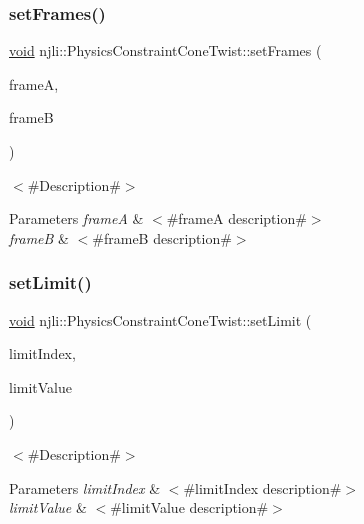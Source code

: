 \subsubsection{\texorpdfstring{set\+Frames()}{setFrames()}}
{\footnotesize\ttfamily \mbox{\hyperlink{_thread_8h_af1e856da2e658414cb2456cb6f7ebc66}{void}} njli\+::\+Physics\+Constraint\+Cone\+Twist\+::set\+Frames (\begin{DoxyParamCaption}\item[{const bt\+Transform \&}]{frameA,  }\item[{const bt\+Transform \&}]{frameB }\end{DoxyParamCaption})}

$<$\#\+Description\#$>$


\begin{DoxyParams}{Parameters}
{\em frameA} & $<$\#frameA description\#$>$ \\
\hline
{\em frameB} & $<$\#frameB description\#$>$ \\
\hline
\end{DoxyParams}
\mbox{\label{classnjli_1_1_physics_constraint_cone_twist_aeed1b0161940309464c6f5f56de1dd22}} 
\subsubsection{\texorpdfstring{set\+Limit()}{setLimit()}\hspace{0.1cm}{\footnotesize\ttfamily [1/2]}}
{\footnotesize\ttfamily \mbox{\hyperlink{_thread_8h_af1e856da2e658414cb2456cb6f7ebc66}{void}} njli\+::\+Physics\+Constraint\+Cone\+Twist\+::set\+Limit (\begin{DoxyParamCaption}\item[{int}]{limit\+Index,  }\item[{\mbox{\hyperlink{_util_8h_a5f6906312a689f27d70e9d086649d3fd}{f32}}}]{limit\+Value }\end{DoxyParamCaption})}

$<$\#\+Description\#$>$


\begin{DoxyParams}{Parameters}
{\em limit\+Index} & $<$\#limit\+Index description\#$>$ \\
\hline
{\em limit\+Value} & $<$\#limit\+Value description\#$>$ \\
\hline
\end{DoxyParams}
\mbox{\label{classnjli_1_1_physics_constraint_cone_twist_a708e02ef79f7e67c13eb5bfb82a76115}} 
